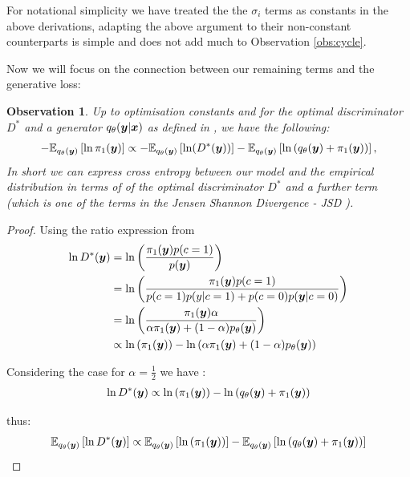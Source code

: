 \documentclass[a4paper,12pt,twoside,openright]{report}
\newtheorem{observation}[theorem]{Observation}
\theoremstyle{definition}
\begin{document}
For notational simplicity we have treated the the $\sigma_i$ terms as constants in the above derivations, adapting the above argument to their non-constant counterparts is simple and does not add much to Observation \ref{obs:cycle}.


 Now we will focus on the connection between our remaining terms and the generative loss:

\begin{observation}
Up to optimisation constants and for the optimal discriminator $D^{*}$ and a generator $q_{\theta}({\bm{y}} | {\bm{x}})$ as defined in \citep{goodfellow2014generative,mohamed2016learning}, we have the following:
\begin{align*}
-\mathbb{E}_{q_{\theta}({\bm{y}})}\left[ \operatorname{ln}  \pi_1({\bm{y}}) \right] \propto-\mathbb{E}_{q_{\theta}({\bm{y}})}\left[\operatorname{ln}(D^{*}({\bm{y}}))\right] - \mathbb{E}_{q_{\theta}({\bm{y}})}\left[\operatorname{ln}\left(q_{\theta}({\bm{y}}) + \pi_1({\bm{y}})\right)\right],
\end{align*}
In short we can express cross entropy between our model and the empirical distribution in terms of of the optimal discriminator $D^{*}$ and a further term (which is one of the terms in the Jensen Shannon Divergence - JSD ). 
\end{observation}
\begin{proof}

Using the ratio expression from \cite{mohamed2016learning}
\begin{align*}
\operatorname{ln} D^{*}({\bm{y}}) &= \operatorname{ln}\left(\frac{\pi_1({\bm{y}})p(c=1)}{p({\bm{y}})}\right) \\
&=\operatorname{ln}\left(\frac{\pi_1({\bm{y}})p(c=1)}{p(c=1)p(y|c=1) + p(c=0)p({\bm{y}}|c=0)}\right) \\
&= \operatorname{ln}\left(\frac{\pi_1({\bm{y}})\alpha}{\alpha\pi_1({\bm{y}}) + (1-\alpha)  p_{\theta}({\bm{y}})}\right) \\
&\propto \operatorname{ln}\left(\pi_1({\bm{y}})\right) - \operatorname{ln}\left(\alpha\pi_1({\bm{y}})  + (1-\alpha)p_{\theta}({\bm{y}}) \right)
\end{align*}

Considering the case for $\alpha=\frac{1}{2}$ we have : 
\begin{align*}
\operatorname{ln} D^{*}({\bm{y}}) \propto \operatorname{ln}\left(\pi_1({\bm{y}})\right) - \operatorname{ln}\left(q_{\theta}({\bm{y}}) + \pi_1({\bm{y}})\right)
\end{align*}

thus:
\begin{align}\label{eq:gan_entropy}
\mathbb{E}_{q_{\theta}({\bm{y}})}\left[\operatorname{ln} D^{*}({\bm{y}})\right] \propto \mathbb{E}_{q_{\theta}({\bm{y}})}\left[\operatorname{ln}\left(\pi_1({\bm{y}})\right)\right] -\mathbb{E}_{q_{\theta}({\bm{y}})}\left[\operatorname{ln}\left(q_{\theta}({\bm{y}}) + \pi_1({\bm{y}})\right)\right]
\end{align}

\end{proof}
\end{document}
